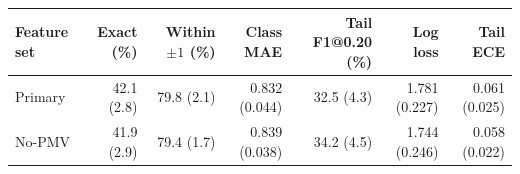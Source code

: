 \begin{tabular}{lrrrrrr}
\toprule
Feature set & Exact (\%) & Within $\pm1$ (\%) & Class MAE & Tail F1@0.20 (\%) & Log loss & Tail ECE \\
\midrule
Primary & 42.1 (2.8) & 79.8 (2.1) & 0.832 (0.044) & 32.5 (4.3) & 1.781 (0.227) & 0.061 (0.025) \\
No-PMV & 41.9 (2.9) & 79.4 (1.7) & 0.839 (0.038) & 34.2 (4.5) & 1.744 (0.246) & 0.058 (0.022) \\
\bottomrule
\end{tabular}
